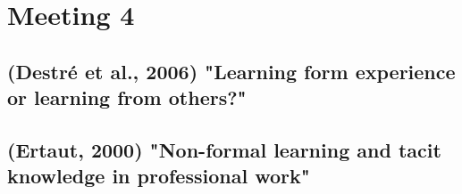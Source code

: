 \documentclass[12pt,a4paper]{article}
\begin{document}
\section{Meeting 4} %
\label{prt:Meeting 4}
\subsection{(Destré et al., 2006) "Learning form experience or learning from others?"} %
  \label{sec:Destré et al., 2006}
  

\subsection{(Ertaut, 2000) "Non-formal learning and tacit knowledge in professional work"} %
 \label{sec:(Ertaut, 2000}
 



\end{document}
